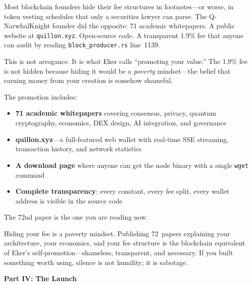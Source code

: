 \documentclass[11pt,a4paper]{article}
\begin{document}
\vspace{0.3cm}

Most blockchain founders hide their fee structures in footnotes---or
worse, in token vesting schedules that only a securities lawyer can
parse. The Q-NarwhalKnight founder did the opposite: 71 academic
whitepapers. A public website at \texttt{quillon.xyz}. Open-source
code. A transparent 1.9\% fee that anyone can audit by reading
\texttt{block\_producer.rs} line~1139.

This is not arrogance. It is what Eker calls ``promoting your value.''
The 1.9\% fee is not hidden because hiding it would be a \emph{poverty}
mindset---the belief that earning money from your creation is somehow
shameful.

The promotion includes:

\begin{itemize}[leftmargin=2em]
    \item \textbf{71 academic whitepapers} covering consensus, privacy,
          quantum cryptography, economics, DEX design, AI integration,
          and governance
    \item \textbf{quillon.xyz}---a full-featured web wallet with real-time
          SSE streaming, transaction history, and network statistics
    \item \textbf{A download page} where anyone can get the node binary
          with a single \texttt{wget} command
    \item \textbf{Complete transparency}: every constant, every fee split,
          every wallet address is visible in the source code
\end{itemize}

The 72nd paper is the one you are reading now.

\begin{principle}[title={\textbf{The Principle}}]
Hiding your fee is a poverty mindset. Publishing 72~papers explaining
your architecture, your economics, and your fee structure is the
blockchain equivalent of Eker's self-promotion---shameless, transparent,
and necessary. If you built something worth using, silence is not
humility; it is sabotage.
\end{principle}


\newpage
\begin{center}
{\LARGE\bfseries\color{qugpurple} Part IV: The Launch}\\[0.3cm]
\end{center}
\vspace{0.5cm}
\end{document}
